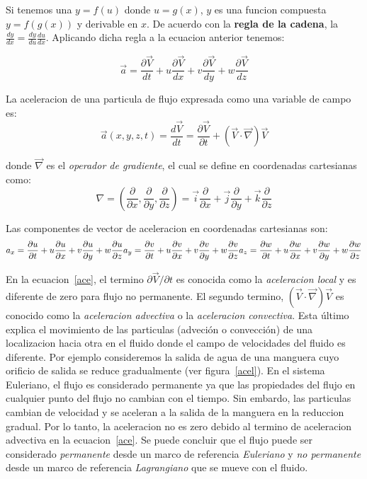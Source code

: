 \documentclass[10pt, oneside]{article}
\begin{document}
Si tenemos una  $y=f(u)$ donde $u=g(x)$, $y$ es una funcion compuesta $y=f(g(x))$ y derivable en $x$. De acuerdo con la \textbf{regla de la cadena}, la $\frac{dy}{dx}=\frac{dy}{du} \frac{du}{dx}$. Aplicando dicha regla a la ecuacion anterior tenemos: 

$$
\vec{a}=\frac{\partial \vec{V}}{dt} + u\frac{\partial \vec{V}}{dx} + v\frac{\partial \vec{V}}{dy} + w\frac{\partial \vec{V}}{dz}
$$

La aceleracion de una particula de flujo expresada como una variable de campo es:
\begin{equation}
\vec a(x,y,z,t) = \frac{d \vec{V}}{dt} = \frac{\partial \vec{V}}{\partial t} + (\vec{V} \cdot \vec{\nabla})\vec{V}
\label{ace}
\end{equation}

donde $\vec{\nabla}$ es el \emph{operador de gradiente}, el cual se define en coordenadas cartesianas como:
$$
\nabla = \left( \frac{\partial}{\partial x} , \frac{\partial}{\partial y}, \frac{\partial}{\partial z} \right) = \vec{i}\frac{\partial}{\partial x} +\vec{j}\frac{\partial}{\partial y}  + \vec{k}\frac{\partial}{\partial z}
$$

Las componentes de vector de aceleracion en coordenadas cartesianas son:
$$
a_x = \frac{\partial u}{\partial t} + u\frac{\partial u}{\partial x} + v\frac{\partial u}{\partial y} + w\frac{\partial u}{\partial z} \\
a_y = \frac{\partial v}{\partial t} + u\frac{\partial v}{\partial x} + v\frac{\partial v}{\partial y} + w\frac{\partial v}{\partial z} \\ 
a_z = \frac{\partial w}{\partial t} + u\frac{\partial w}{\partial x} + v\frac{\partial w}{\partial y} + w\frac{\partial w}{\partial z}  
$$

En la ecuacion~\ref{ace}, el termino $\partial \vec{V}/\partial t$ es conocida como la \emph{aceleracion local} y es diferente de zero para flujo no permanente. El segundo termino, $(\vec{V} \cdot \vec{\nabla})\vec{V}$ es conocido como la \emph{aceleracion advectiva} o la \emph{aceleracion convectiva}. Esta \'ultimo explica el movimiento de las particulas (adveci\'on o convecci\'on) de una localizacion hacia otra en el fluido donde el campo de velocidades del fluido es diferente. Por ejemplo consideremos la salida de agua de una manguera cuyo orificio de salida se reduce gradualmente (ver figura~\ref{acel}). En el sistema Euleriano, el flujo es considerado permanente ya que las propiedades del flujo en cualquier punto del flujo no cambian con el tiempo. Sin embardo, las particulas cambian de velocidad y se aceleran a la salida de la manguera en la reduccion gradual. Por lo tanto, la aceleracion no es zero debido al termino de aceleracion advectiva en la ecuacion~\ref{ace}. Se puede concluir que el flujo puede ser considerado \emph{permanente} desde un marco de referencia \emph{Euleriano} y \emph{no permanente} desde un marco de referencia \emph{Lagrangiano} que se mueve con el fluido. 
\end{document}
